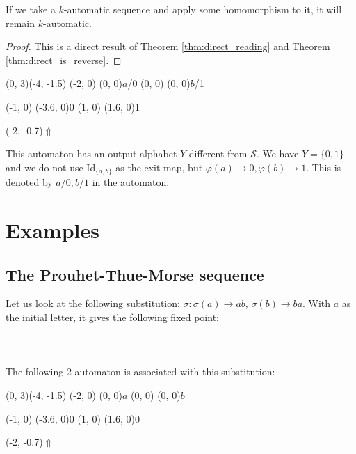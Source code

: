 \documentclass{article}
\begin{document}
\begin{corollary} \label{cor:homomorphism}
If we take a $k$-automatic sequence and apply some homomorphism to it, it will 
remain $k$-automatic.
\end{corollary}

\begin{proof}  
This is a direct result of Theorem \ref{thm:direct_reading} and Theorem
\ref{thm:direct_is_reverse}.
\end{proof}

\begin{example}\label{ex:homomorphism}\end{example}
\begin{graph}(0, 3)(-4, -1.5)
  (-2, 0) (0, 0){$a$/0}
  (0, 0)  (0, 0){$b$/1}

  (-1, 0) \freetext(-3.6, 0){0}
   
   
  (1, 0) \freetext(1.6, 0){1}

  \freetext(-2, -0.7){$\Uparrow$}
\end{graph}

This automaton has an output alphabet $Y$ different from $\mathcal{S}$. We 
have $Y = \{0, 1\}$ and we do not use Id$_{\{a, b\}}$ as the exit map, but
$\varphi(a) \to 0, \varphi(b) \to 1$. This is denoted by
$a/0, b/1$ in the automaton.

\section{Examples}
\subsection{The Prouhet-Thue-Morse sequence}
Let us look at the following substitution: $\sigma: \sigma(a) \to ab$,
$\sigma(b) \to ba$. With $a$ as the initial letter, it gives the
following fixed point:\\
\\
\\
\\
The following 2-automaton is associated with this substitution:\\
\begin{graph}(0, 3)(-4, -1.5)
  (-2, 0) (0, 0){$a$}
  (0, 0)  (0, 0){$b$}

  (-1, 0) \freetext(-3.6, 0){0}
   
   
  (1, 0) \freetext(1.6, 0){0}

  \freetext(-2, -0.7){$\Uparrow$}
\end{graph}
\end{document}
